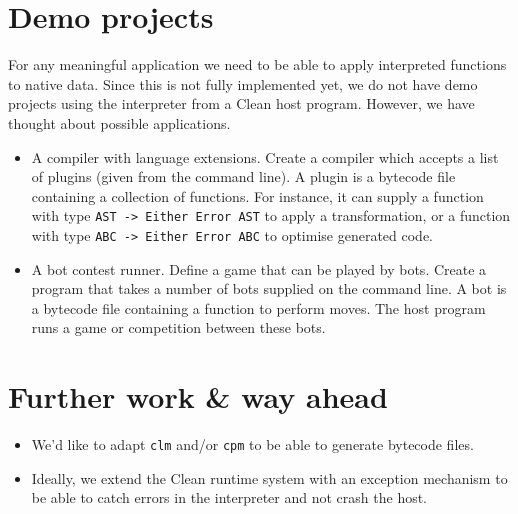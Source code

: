 \documentclass[a4paper]{article}
\begin{document}
\section*{Demo projects}
For any meaningful application we need to be able to apply interpreted functions to native data.
Since this is not fully implemented yet, we do not have demo projects using the interpreter from a Clean host program.
However, we have thought about possible applications.

\begin{itemize}
	\item
		A compiler with language extensions.
		Create a compiler which accepts a list of plugins (given from the command line).
		A plugin is a bytecode file containing a collection of functions.
		For instance, it can supply a function with type \texttt{AST -> Either Error AST} to apply a transformation,
			or a function with type \texttt{ABC -> Either Error ABC} to optimise generated code.

	\item
		A bot contest runner.
		Define a game that can be played by bots.
		Create a program that takes a number of bots supplied on the command line.
		A bot is a bytecode file containing a function to perform moves.
		The host program runs a game or competition between these bots.
\end{itemize}

\section*{Further work \& way ahead}
\begin{itemize}
	\item
		We'd like to adapt \texttt{clm} and/or \texttt{cpm} to be able to generate bytecode files.
	\item
		Ideally, we extend the Clean runtime system with an exception mechanism to be able to catch errors in the interpreter and not crash the host.
\end{itemize}
\end{document}
